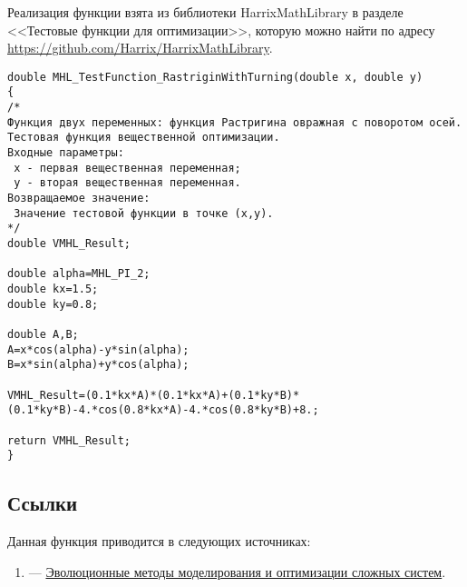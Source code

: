 Реализация функции взята из библиотеки HarrixMathLibrary в разделе <<Тестовые функции для оптимизации>>, которую можно найти по адресу \href{https://github.com/Harrix/HarrixMathLibrary} {https://github.com/Harrix/HarrixMathLibrary}.

\begin{lstlisting}[caption=Код функции MHL\_TestFunction\_RastriginWithTurning]
double MHL_TestFunction_RastriginWithTurning(double x, double y)
{
/*
Функция двух переменных: функция Растригина овражная с поворотом осей.
Тестовая функция вещественной оптимизации.
Входные параметры:
 x - первая вещественная переменная;
 y - вторая вещественная переменная.
Возвращаемое значение:
 Значение тестовой функции в точке (x,y).
*/
double VMHL_Result;

double alpha=MHL_PI_2;
double kx=1.5;
double ky=0.8;

double A,B;
A=x*cos(alpha)-y*sin(alpha);
B=x*sin(alpha)+y*cos(alpha);

VMHL_Result=(0.1*kx*A)*(0.1*kx*A)+(0.1*ky*B)*(0.1*ky*B)-4.*cos(0.8*kx*A)-4.*cos(0.8*ky*B)+8.;

return VMHL_Result;
}
\end{lstlisting}

\subsection {Ссылки}


Данная функция приводится в следующих источниках:

\begin{enumerate}
\item \cite[стр. 28]{book:Semenkin2007} ---  \href{http://files.lib.sfu-kras.ru/ebibl/umkd/22/u_lectures.pdf}{Эволюционные методы моделирования и оптимизации сложных систем}.
\end{enumerate}